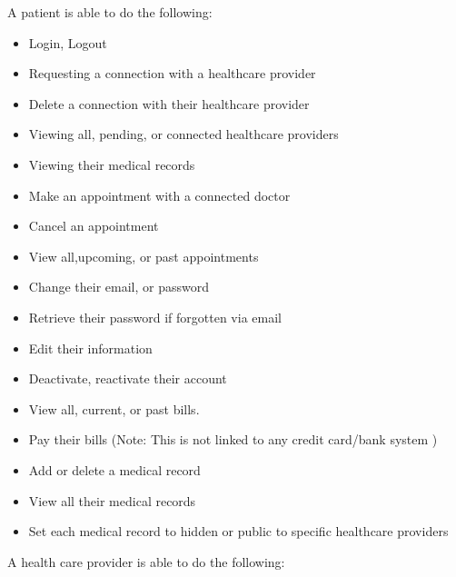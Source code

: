\documentclass[12pt]{report}
\begin{document}
A patient is able to do the following:
\begin{itemize}
\item Login, Logout
\item Requesting a connection with a healthcare provider
\item Delete a connection with their healthcare provider
\item Viewing all, pending, or connected healthcare providers
\item Viewing their medical records
\item Make an appointment with a connected doctor
\item Cancel an appointment 
\item View all,upcoming, or past appointments
\item Change their email, or password
\item Retrieve their password if forgotten via email
\item Edit their information
\item Deactivate, reactivate their account
\item View all, current, or past bills.
\item Pay their bills (Note: This is not linked to any credit card/bank system ) 
\item Add or delete a medical record
\item View all their medical records
\item Set each medical record to hidden or public to specific healthcare providers
\end{itemize}
A health care provider is able to do the following:
\end{document}
